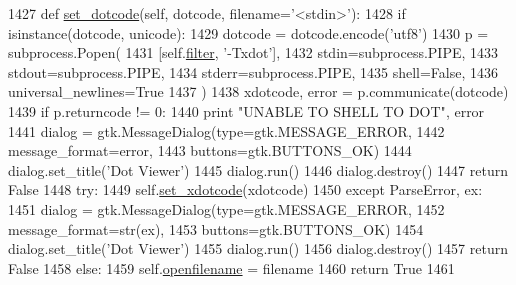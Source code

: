 \begin{DoxyCode}
1427     \textcolor{keyword}{def }\hyperlink{classsmacc__viewer_1_1xdot_1_1xdot_1_1DotWidget_ab824941e96366c2317bae9ae050c222f}{set\_dotcode}(self, dotcode, filename='<stdin>'):
1428         \textcolor{keywordflow}{if} isinstance(dotcode, unicode):
1429             dotcode = dotcode.encode(\textcolor{stringliteral}{'utf8'})
1430         p = subprocess.Popen(
1431             [self.\hyperlink{classsmacc__viewer_1_1xdot_1_1xdot_1_1DotWidget_ad0407b9aa639144d8681497d2b643705}{filter}, \textcolor{stringliteral}{'-Txdot'}],
1432             stdin=subprocess.PIPE,
1433             stdout=subprocess.PIPE,
1434             stderr=subprocess.PIPE,
1435             shell=\textcolor{keyword}{False},
1436             universal\_newlines=\textcolor{keyword}{True}
1437         )
1438         xdotcode, error = p.communicate(dotcode)
1439         \textcolor{keywordflow}{if} p.returncode != 0:
1440             \textcolor{keywordflow}{print} \textcolor{stringliteral}{"UNABLE TO SHELL TO DOT"}, error
1441             dialog = gtk.MessageDialog(type=gtk.MESSAGE\_ERROR,
1442                                        message\_format=error,
1443                                        buttons=gtk.BUTTONS\_OK)
1444             dialog.set\_title(\textcolor{stringliteral}{'Dot Viewer'})
1445             dialog.run()
1446             dialog.destroy()
1447             \textcolor{keywordflow}{return} \textcolor{keyword}{False}
1448         \textcolor{keywordflow}{try}:
1449             self.\hyperlink{classsmacc__viewer_1_1xdot_1_1xdot_1_1DotWidget_a65e9fda7d32b70ae4e4df83f01e9ddd1}{set\_xdotcode}(xdotcode)
1450         \textcolor{keywordflow}{except} ParseError, ex:
1451             dialog = gtk.MessageDialog(type=gtk.MESSAGE\_ERROR,
1452                                        message\_format=str(ex),
1453                                        buttons=gtk.BUTTONS\_OK)
1454             dialog.set\_title(\textcolor{stringliteral}{'Dot Viewer'})
1455             dialog.run()
1456             dialog.destroy()
1457             \textcolor{keywordflow}{return} \textcolor{keyword}{False}
1458         \textcolor{keywordflow}{else}:
1459             self.\hyperlink{classsmacc__viewer_1_1xdot_1_1xdot_1_1DotWidget_a4698d9416255a0026e38a545f6c0ec5f}{openfilename} = filename
1460             \textcolor{keywordflow}{return} \textcolor{keyword}{True}
1461 
\end{DoxyCode}


